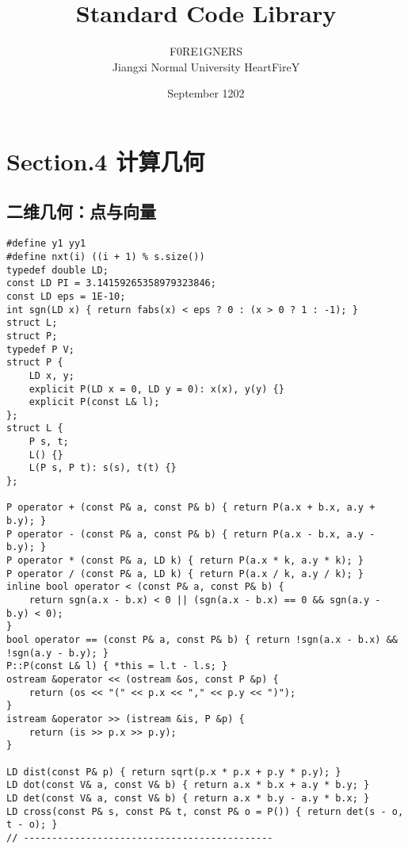 \documentclass[]{article}
\date{}
\title{\vspace{50mm} \huge Standard Code Library \\[20pt]}
\author{F0RE1GNERS \\[10pt] Jiangxi Normal University HeartFireY}
\date{September 1202}
\begin{document}
\begin{titlepage}

\maketitle

\end{titlepage}

\newpage

\renewcommand\labelitemi{$\bullet$}

{
\setcounter{tocdepth}{3}
\tableofcontents
\newpage
}








\hypertarget{section.4-ux8ba1ux7b97ux51e0ux4f55}{%
\section{Section.4 计算几何}\label{section.4-ux8ba1ux7b97ux51e0ux4f55}}

\hypertarget{ux4e8cux7ef4ux51e0ux4f55ux70b9ux4e0eux5411ux91cf}{%
\subsection{二维几何：点与向量}\label{ux4e8cux7ef4ux51e0ux4f55ux70b9ux4e0eux5411ux91cf}}

\begin{verbatim}
#define y1 yy1
#define nxt(i) ((i + 1) % s.size())
typedef double LD;
const LD PI = 3.14159265358979323846;
const LD eps = 1E-10;
int sgn(LD x) { return fabs(x) < eps ? 0 : (x > 0 ? 1 : -1); }
struct L;
struct P;
typedef P V;
struct P {
    LD x, y;
    explicit P(LD x = 0, LD y = 0): x(x), y(y) {}
    explicit P(const L& l);
};
struct L {
    P s, t;
    L() {}
    L(P s, P t): s(s), t(t) {}
};

P operator + (const P& a, const P& b) { return P(a.x + b.x, a.y + b.y); }
P operator - (const P& a, const P& b) { return P(a.x - b.x, a.y - b.y); }
P operator * (const P& a, LD k) { return P(a.x * k, a.y * k); }
P operator / (const P& a, LD k) { return P(a.x / k, a.y / k); }
inline bool operator < (const P& a, const P& b) {
    return sgn(a.x - b.x) < 0 || (sgn(a.x - b.x) == 0 && sgn(a.y - b.y) < 0);
}
bool operator == (const P& a, const P& b) { return !sgn(a.x - b.x) && !sgn(a.y - b.y); }
P::P(const L& l) { *this = l.t - l.s; }
ostream &operator << (ostream &os, const P &p) {
    return (os << "(" << p.x << "," << p.y << ")");
}
istream &operator >> (istream &is, P &p) {
    return (is >> p.x >> p.y);
}

LD dist(const P& p) { return sqrt(p.x * p.x + p.y * p.y); }
LD dot(const V& a, const V& b) { return a.x * b.x + a.y * b.y; }
LD det(const V& a, const V& b) { return a.x * b.y - a.y * b.x; }
LD cross(const P& s, const P& t, const P& o = P()) { return det(s - o, t - o); }
// --------------------------------------------
\end{verbatim}
\end{document}
